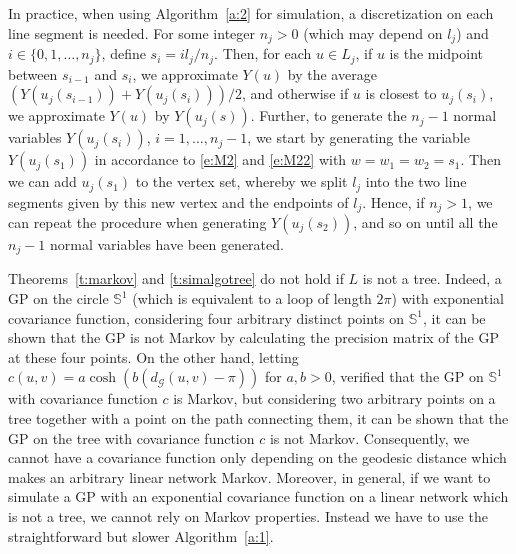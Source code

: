 \documentclass[alpha-refs]{wiley-article}
\begin{document}
In practice, when using Algorithm~\ref{a:2} for simulation, a discretization on each line segment is needed. For some integer $n_j>0$ (which may depend on $l_j$) and $i\in\{0,1,\ldots,{n_j}\}$, define $s_i=i l_j/{n_j}$. Then, for
each $u\in L_j$, if $u$ is the midpoint between $s_{i-1}$ and $s_i$, we approximate $Y(u)$ by the average $(Y(u_j(s_{i-1}))+Y(u_j(s_i)))/2$, and otherwise if $u$ is closest to $u_j(s_i)$, we approximate $Y(u)$ by 
$Y(u_j(s))$. Further,
to generate the ${n_j}-1$ normal variables $Y(u_j(s_i))$, $i=1,\ldots,{n_j}-1$, we start by generating the variable $Y(u_j(s_1))$ in accordance to \eqref{e:M2} and \eqref{e:M22} with $w=w_1=w_2=s_1$. Then we can add $u_j(s_1)$ to the vertex set, whereby we split $l_j$ into the two line segments given by this new vertex and the endpoints of $l_j$. Hence, if $n_j>1$, we can repeat the procedure when generating $Y(u_j(s_2))$, and so on until all the $n_j-1$ normal variables have been generated.  


Theorems~\ref{t:markov} and \ref{t:simalgotree} do not hold if $L$ is not a tree. Indeed, a GP on the circle $\mathbb S^1$ (which is equivalent to a loop of length $2\pi$) with exponential covariance function, considering four arbitrary distinct points on $\mathbb S^1$, it can be shown that the GP is not  
Markov by calculating the precision matrix of the GP at these four points. On the other hand, letting $c(u,v) = a \cosh(b(d_\mathcal{G}(u,v) -\pi))$ for $a,b>0$,
\cite{Pitt71} verified that the GP on $\mathbb S^1$ with covariance function $c$ is Markov, but considering two arbitrary points on a tree together with a point on the path connecting them, it can be shown that the GP on the tree with covariance function $c$ is not Markov.
Consequently, we cannot have a covariance function only depending on the geodesic distance which makes an arbitrary linear network Markov. Moreover, 
 in general, if we want to simulate a GP with an exponential covariance function on a linear network which is not a tree, we cannot rely on Markov properties. Instead we have to use the straightforward but slower Algorithm~\ref{a:1}.
 
\end{document}
